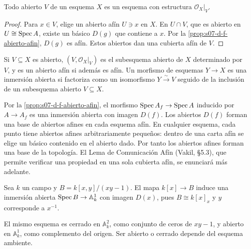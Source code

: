 \begin{prop}
\label{prop:s07-todo-abierto-esquema-esquema}
Todo abierto $V$ de un esquema $X$ es un esquema con estructura $\mathcal O_X|_V$.
\end{prop}
\begin{proof}
Para $x\in V$, elige un abierto afín $U\ni x$ en $X$. En $U\cap V$, que es abierto en $U\cong\operatorname{Spec} A$, existe un básico $D(g)$ que contiene a $x$. Por la \cref{prop:s07-d-f-abierto-afin}, $D(g)$ es afín. Estos abiertos dan una cubierta afín de $V$.
\end{proof}

\begin{defi}
\label{defi:s07-subesquema-abierto-abierto-afin-inmersion}
Si $V\subseteq X$ es abierto, $(V,\mathcal O_X|_V)$ es el subesquema abierto de $X$ determinado por $V$, y es un abierto afín si además es afín. Un morfismo de esquemas $Y\to X$ es una inmersión abierta si factoriza como un isomorfismo $Y\xrightarrow{\sim}V$ seguido de la inclusión de un subesquema abierto $V\subseteq X$.
\end{defi}

\begin{obs}
\label{obs:s07-abiertos-d-f-forman-base}
Por la \cref{prop:s07-d-f-abierto-afin}, el morfismo $\operatorname{Spec} A_f\to\operatorname{Spec} A$ inducido por $A\to A_f$ es una inmersión abierta con imagen $D(f)$. Los abiertos $D(f)$ forman una base de abiertos afines en cada esquema afín. En cualquier esquema, cada punto tiene abiertos afines arbitrariamente pequeños: dentro de una carta afín se elige un básico contenido en el abierto dado. Por tanto los abiertos afines forman una base de la topología. El Lema de Comunicación Afín (Vakil, \S5.3), que permite verificar una propiedad en una sola cubierta afín, se enunciará más adelante.
\end{obs}

\begin{ejem}[La hipérbola]
\label{ejem:s07-hiperbola}
Sea $k$ un campo y $B=k[x,y]/(xy-1)$. El mapa $k[x]\to B$ induce una inmersión abierta $\operatorname{Spec} B\to\mathbb A_k^1$ con imagen $D(x)$, pues $B\cong k[x]_x$ y $y$ corresponde a $x^{-1}$.
\end{ejem}
\begin{obs}
\label{obs:s07-mismo-esquema-cerrado-k-2}
El mismo esquema es cerrado en $\mathbb A_k^2$, como conjunto de ceros de $xy-1$, y abierto en $\mathbb A_k^1$, como complemento del origen. Ser abierto o cerrado depende del esquema ambiente.
\end{obs}

